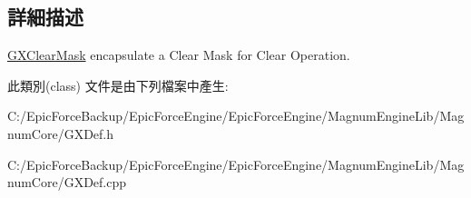 \subsection{詳細描述}
\hyperlink{class_magnum_1_1_g_x_clear_mask}{G\+X\+Clear\+Mask} encapsulate a Clear Mask for Clear Operation. 

此類別(class) 文件是由下列檔案中產生\+:\begin{DoxyCompactItemize}
\item 
C\+:/\+Epic\+Force\+Backup/\+Epic\+Force\+Engine/\+Epic\+Force\+Engine/\+Magnum\+Engine\+Lib/\+Magnum\+Core/G\+X\+Def.\+h\item 
C\+:/\+Epic\+Force\+Backup/\+Epic\+Force\+Engine/\+Epic\+Force\+Engine/\+Magnum\+Engine\+Lib/\+Magnum\+Core/G\+X\+Def.\+cpp\end{DoxyCompactItemize}
